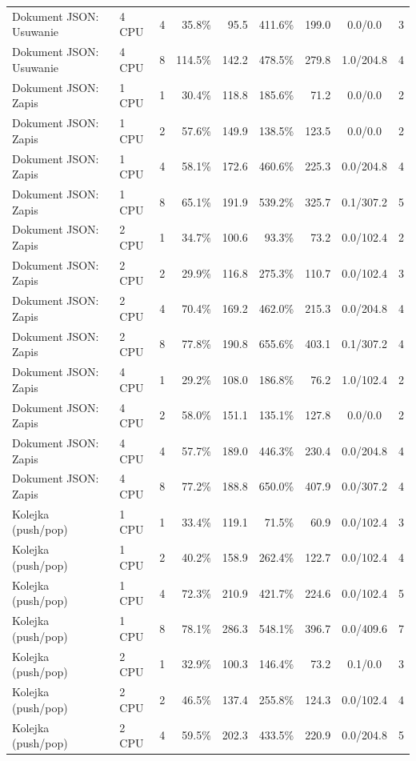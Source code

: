 \begin{table}[ht]
{\begin{tabular}{llcrrrrcc}
Dokument JSON: Usuwanie & 4 CPU & 4 & 35.8\% & 95.5 & 411.6\% & 199.0 & 0.0/0.0 & 3 \\
Dokument JSON: Usuwanie & 4 CPU & 8 & 114.5\% & 142.2 & 478.5\% & 279.8 & 1.0/204.8 & 4 \\
Dokument JSON: Zapis & 1 CPU & 1 & 30.4\% & 118.8 & 185.6\% & 71.2 & 0.0/0.0 & 2 \\
Dokument JSON: Zapis & 1 CPU & 2 & 57.6\% & 149.9 & 138.5\% & 123.5 & 0.0/0.0 & 2 \\
Dokument JSON: Zapis & 1 CPU & 4 & 58.1\% & 172.6 & 460.6\% & 225.3 & 0.0/204.8 & 4 \\
Dokument JSON: Zapis & 1 CPU & 8 & 65.1\% & 191.9 & 539.2\% & 325.7 & 0.1/307.2 & 5 \\
Dokument JSON: Zapis & 2 CPU & 1 & 34.7\% & 100.6 & 93.3\% & 73.2 & 0.0/102.4 & 2 \\
Dokument JSON: Zapis & 2 CPU & 2 & 29.9\% & 116.8 & 275.3\% & 110.7 & 0.0/102.4 & 3 \\
Dokument JSON: Zapis & 2 CPU & 4 & 70.4\% & 169.2 & 462.0\% & 215.3 & 0.0/204.8 & 4 \\
Dokument JSON: Zapis & 2 CPU & 8 & 77.8\% & 190.8 & 655.6\% & 403.1 & 0.1/307.2 & 4 \\
Dokument JSON: Zapis & 4 CPU & 1 & 29.2\% & 108.0 & 186.8\% & 76.2 & 1.0/102.4 & 2 \\
Dokument JSON: Zapis & 4 CPU & 2 & 58.0\% & 151.1 & 135.1\% & 127.8 & 0.0/0.0 & 2 \\
Dokument JSON: Zapis & 4 CPU & 4 & 57.7\% & 189.0 & 446.3\% & 230.4 & 0.0/204.8 & 4 \\
Dokument JSON: Zapis & 4 CPU & 8 & 77.2\% & 188.8 & 650.0\% & 407.9 & 0.0/307.2 & 4 \\
Kolejka (push/pop) & 1 CPU & 1 & 33.4\% & 119.1 & 71.5\% & 60.9 & 0.0/102.4 & 3 \\
Kolejka (push/pop) & 1 CPU & 2 & 40.2\% & 158.9 & 262.4\% & 122.7 & 0.0/102.4 & 4 \\
Kolejka (push/pop) & 1 CPU & 4 & 72.3\% & 210.9 & 421.7\% & 224.6 & 0.0/102.4 & 5 \\
Kolejka (push/pop) & 1 CPU & 8 & 78.1\% & 286.3 & 548.1\% & 396.7 & 0.0/409.6 & 7 \\
Kolejka (push/pop) & 2 CPU & 1 & 32.9\% & 100.3 & 146.4\% & 73.2 & 0.1/0.0 & 3 \\
Kolejka (push/pop) & 2 CPU & 2 & 46.5\% & 137.4 & 255.8\% & 124.3 & 0.0/102.4 & 4 \\
Kolejka (push/pop) & 2 CPU & 4 & 59.5\% & 202.3 & 433.5\% & 220.9 & 0.0/204.8 & 5 \\

\end{tabular}}
\end{table}
